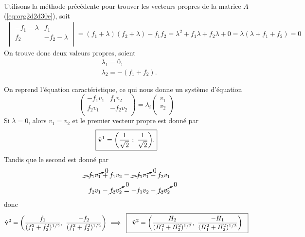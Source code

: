 \documentclass[10pt]{article}
\numberwithin{equation}{section}
\newcommand{\vv}{\vb{v}}
\begin{document}
Utilisons la méthode précédente pour trouver les vecteurs propres de la matrice \(A\) (\ref{eq:org2d2d30e}), soit
\begin{align}
   \begin{vmatrix}
     -f_1 - \lambda & f_1 \\
     f_2 & -f_2 - \lambda \\
   \end{vmatrix} = (f_1+\lambda)(f_2+\lambda) - f_1 f_2 = \lambda^2 + f_1 \lambda + f_2 \lambda + 0 =\boxed{ \lambda(\lambda + f_1 + f_2) = 0 }
\end{align}
On trouve donc deux valeurs propres, soient
\begin{subequations}
\begin{align}
   & \lambda_1 = 0, \\
   & \lambda_2 = - (f_1+f_2).
\end{align}
\end{subequations}

On reprend l'équation caractéristique, ce qui nous donne un système d'équation
\begin{equation}
   \begin{pmatrix}
     - f_1 v_1 & f_1 v_2 \\
     f_2 v_1 & -f_2 v_2 \\
   \end{pmatrix} = \lambda_i
   \begin{pmatrix}
     v_1\\
     v_2\\
   \end{pmatrix}
\end{equation}
Si \(\lambda = 0\), alors \(v_1 = v_2\) et le premier vecteur propre est donné par
\begin{equation}
   \boxed{\hat{\vv}^1 = \qty( \frac{1}{\sqrt{2}}\ ;\ \frac{1}{\sqrt{2}}).}
\end{equation}
Tandis que le second est donné par
\begin{align}
   \cancelto{0}{-f_1 v_1} + f_1 v_2 & = \cancelto{0}{-f_1 v_1} - f_2 v_1 \\
   f_2 v_1 - \cancelto{0}{f_2 v_2} & = -f_1 v_2 - \cancelto{0}{f_2 v_2} \\
\end{align}
donc
\begin{equation}
   \hat{\vv}^2 = \qty( \frac{f_1}{(f_1^2+f_2^2)^{1/2}},\ \frac{-f_2}{(f_1^2+f_2^2)^{1/2}})\ \Longrightarrow \hspace{0.2cm}\boxed{\hspace{0.2cm}\hat{\vv}^2=\qty( \frac{H_2}{(H_1^2+H_2^2)^{1/2}},\ \frac{-H_1}{(H_1^2+H_2^2)^{1/2}})\hspace{0.2cm}}
\end{equation}
\end{document}
